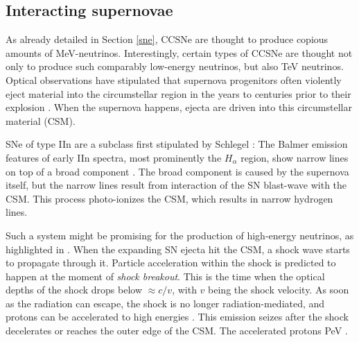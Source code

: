 \documentclass[
    a4paper, %
    fontsize=10pt, %
    twoside=false, %
    numbers=noenddot, %
    fontmethod=tex,
]{kaobook}
\begin{document}
\subsection{Interacting supernovae}
As already detailed in Section \ref{sne}, CCSNe are thought to produce copious amounts of \unit{\mega\eV}-neutrinos. Interestingly, certain types of CCSNe are thought not only to produce such comparably low-energy neutrinos, but also \unit{\tera\eV} neutrinos. Optical observations have stipulated that supernova progenitors often violently eject material into the circumstellar region in the years to centuries prior to their explosion . When the supernova happens, ejecta are driven into this circumstellar material (CSM).

SNe of type IIn are a subclass first stipulated by Schlegel : The Balmer emission features of early IIn spectra, most prominently the $H_\alpha$ region, show narrow lines on top of a broad component . The broad component is caused by the supernova itself, but the narrow lines result from interaction of the SN blast-wave with the CSM. This process photo-ionizes the CSM, which results in narrow hydrogen lines.

Such a system might be promising for the production of high-energy neutrinos, as highlighted in . When the expanding SN ejecta hit the CSM, a shock wave starts to propagate through it. Particle acceleration within the shock is predicted to happen at the moment of \textit{shock breakout}. This is the time when the optical depths of the shock drops below $\approx c/v$, with $v$ being the shock velocity. As soon as the radiation can escape, the shock is no longer radiation-mediated, and protons can be accelerated to high energies . This emission seizes after the shock decelerates or reaches the outer edge of the CSM. The accelerated protons \unit{\peta\eV} .


% 
% 
% 

\end{document}
